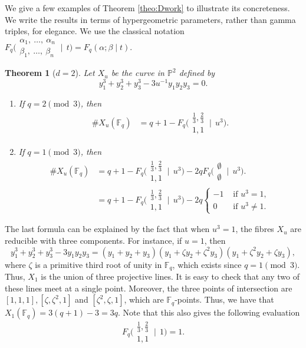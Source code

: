 \documentclass[11pt, reqno]{amsart}
\theoremstyle{plain}
\newtheorem{theo}{Theorem}[section]
\theoremstyle{definition}
\newcommand{\Ps}{\mathbb{P}}
\newcommand{\F}{\mathbb{F}}
\newcommand{\be}{\beta}
\newcommand{\al}{\alpha}
\begin{document}
We give a few examples of Theorem \ref{theo:Dwork} to illustrate its concreteness. We write the results in terms of hypergeometric parameters, rather than gamma triples, for elegance. We use the classical notation  $F_q\biggl(\begin{matrix} \al_1, \ \ldots, \ \al_n \\ \be_1, \ \ldots, \ \be_n \end{matrix} \:\bigg|\:\: t\biggr) = F_q(\al ; \be \mid t)$.
\begin{theo}[$d=2$]\label{theo:dwork-2}
Let $X_u$ be the curve in $\Ps^2$ defined by
\[
y_1^{3}+y_2^{3} + y_3^3 -3u^{-1} y_1y_2y_3 =0.
\]
\begin{enumerate}
    \item   If $q=2 \pmod{3}$, then
    \begin{align*}
    \#X_u(\F_q) &=  q+1 - F_q\biggl(\begin{matrix} \frac{1}{3},  \frac{2}{3} \\ 1,   1 \end{matrix} \:\bigg|\:\: u^{3} \biggr).
    \end{align*}
    \item If $q=1 \pmod{3}$, then 
    \begin{align*}
    \#X_u(\F_q) &=  q+1 - F_q\biggl(\begin{matrix} \frac{1}{3},  \frac{2}{3} \\ 1,  1 \end{matrix} \:\bigg|\:\: u^{3} \biggr) - 2qF_q\biggl(\begin{matrix} \emptyset \\ \emptyset \end{matrix} \:\bigg|\:\: u^{3} \biggr). \\
    &=  q+1 - F_q\biggl(\begin{matrix} \frac{1}{3},  \frac{2}{3} \\ 1,  1 \end{matrix} \:\bigg|\:\: u^{3} \biggr) -2q \begin{cases}
    -1 &\text{ if } u^3 =1,\\
    0 &\text{ if } u^3 \neq 1. 
    \end{cases}
    \end{align*}
\end{enumerate}
\end{theo}
The last formula can be explained by the fact that when $u^3=1$, the fibres $X_u$ are reducible with three components. For instance, if $u=1$, then
\[
y_1^{3}+y_2^{3} + y_3^3 -3 y_1y_2y_3= (y_1+y_2+y_3)(y_1+\zeta y_2+\zeta ^2y_3)(y_1+\zeta ^2y_2+\zeta y_3),
\]
where $\zeta $ is a primitive third root of unity in $\F_q$, which exists since $q=1 \pmod{3}$. Thus, $X_1$ is the union of three projective lines. It is easy to check that any two of these lines meet at a single point. Moreover, the three points of intersection are $[1,1,1],[\zeta ,\zeta^{2},1]$ and $[\zeta^{2},\zeta ,1]$, which are $\F_q$-points. Thus, we have that $X_1(\F_q) = 3 (q+1) -3 = 3q$. Note that this also gives the following evaluation
\[
F_q\biggl(\begin{matrix} \frac{1}{3},  \frac{2}{3} \\ 1,  1 \end{matrix} \:\bigg|\:\: 1 \biggr) =1.
\]
\end{document}
